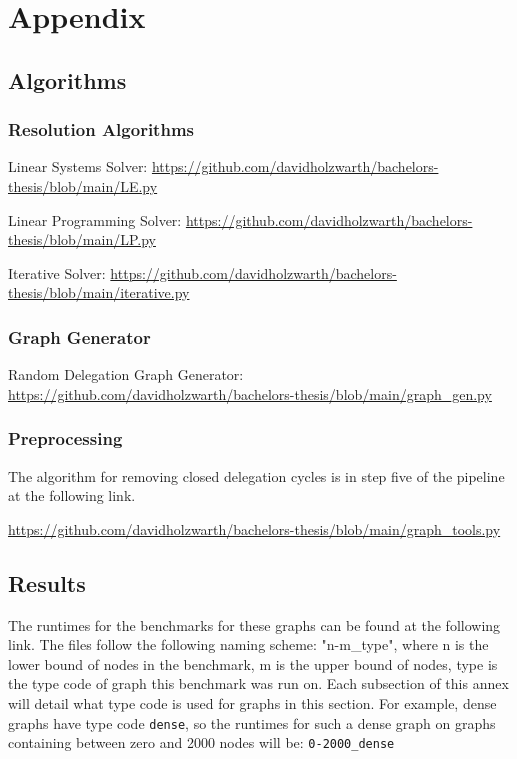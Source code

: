 
\chapter{Appendix}

\section{Algorithms}

\subsection{Resolution Algorithms}
\label{an:resolution_algorithms}

Linear Systems Solver: \url{https://github.com/davidholzwarth/bachelors-thesis/blob/main/LE.py}

Linear Programming Solver: \url{https://github.com/davidholzwarth/bachelors-thesis/blob/main/LP.py}

Iterative Solver: \url{https://github.com/davidholzwarth/bachelors-thesis/blob/main/iterative.py}

\subsection{Graph Generator}
\label{an:graph_generators}

Random Delegation Graph Generator: \url{https://github.com/davidholzwarth/bachelors-thesis/blob/main/graph_gen.py}

\subsection{Preprocessing}
\label{an:preprocessing}

The algorithm for removing closed delegation cycles is in step five of the pipeline at the following link.

\url{https://github.com/davidholzwarth/bachelors-thesis/blob/main/graph_tools.py}

\section{Results}
\label{an:results}

The runtimes for the benchmarks for these graphs can be found at the following link. The files follow the following naming scheme: "n-m\_type", where n is the lower bound of nodes in the benchmark, m is the upper bound of nodes, type is the type code of graph this benchmark was run on. Each subsection of this annex will detail what type code is used for graphs in this section. For example, dense graphs have type code \texttt{dense}, so the runtimes for such a dense graph on graphs containing between zero and 2000 nodes will be: \texttt{0-2000\_dense}

